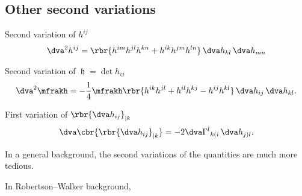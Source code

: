 \documentclass[a4paper,11pt]{article}
\begin{document}
\subsection*{Other second variations}

Second variation of $h^{ij}$
\begin{align}
\dva^2 h^{ij} = \rbr{h^{im}h^{jl}h^{kn}+h^{ik}h^{jm}h^{ln}}
\,\dva h_{kl}\,\dva h_{mn}
\end{align}

Second variation of $\mfrakh = \det h_{ij}$
\begin{align}
\dva^2 \mfrakh = -\frac{1}{4} \mfrakh \rbr{
h^{ik}h^{jl}+h^{il}h^{kj}-h^{ij}h^{kl}}\,\dva h_{ij}\,\dva h_{kl}.
\end{align}

First variation of $\rbr{\dva h_{ij}}_{|k}$
\begin{align}
\dva\cbr{\rbr{\dva h_{ij}}_{|k}} = -2 \dva\Gamma^l{}_{k(i}\,\dva h_{j)l}.
\end{align}



In a general background, the second variations of the quantities are much more 
tedious.

In Robertson--Walker background, 


\printbibliography
\end{document}
